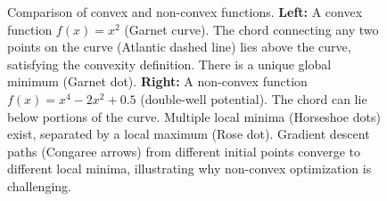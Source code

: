 \begin{figure}[htbp]
\caption{Comparison of convex and non-convex functions. \textbf{Left:} A convex function $f(x) = x^2$ (Garnet curve). The chord connecting any two points on the curve (Atlantic dashed line) lies above the curve, satisfying the convexity definition. There is a unique global minimum (Garnet dot). \textbf{Right:} A non-convex function $f(x) = x^4 - 2x^2 + 0.5$ (double-well potential). The chord can lie below portions of the curve. Multiple local minima (Horseshoe dots) exist, separated by a local maximum (Rose dot). Gradient descent paths (Congaree arrows) from different initial points converge to different local minima, illustrating why non-convex optimization is challenging.}
\label{fig:convex_nonconvex}
\end{figure}
